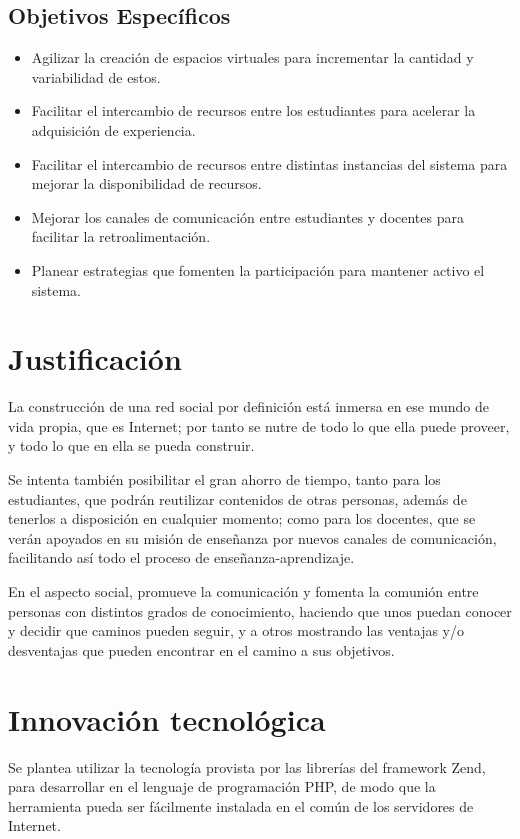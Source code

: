 \subsection{Objetivos Específicos}
\begin{itemize}
\item Agilizar la creación de espacios virtuales para incrementar la cantidad y
variabilidad de estos.
\item Facilitar el intercambio de recursos entre los estudiantes para acelerar
la adquisición de experiencia.
\item Facilitar el intercambio de recursos entre distintas instancias del
sistema para mejorar la disponibilidad de recursos.
\item Mejorar los canales de comunicación entre estudiantes y docentes para
facilitar la retroalimentación.
\item Planear estrategias que fomenten la participación para mantener activo el
sistema.
\end{itemize}

\section{Justificación}
La construcción de una red social por definición está inmersa en ese mundo de
vida propia, que es Internet; por tanto se nutre de todo lo que ella puede
proveer, y todo lo que en ella se pueda construir.

Se intenta también posibilitar el gran ahorro de tiempo, tanto para los
estudiantes, que podrán reutilizar contenidos de otras personas, además de
tenerlos a disposición en cualquier momento; como para los docentes, que se
verán apoyados en su misión de enseñanza por nuevos canales de comunicación,
facilitando así todo el proceso de enseñanza-aprendizaje.

En el aspecto social, promueve la comunicación y fomenta la comunión entre
personas con distintos grados de conocimiento, haciendo que unos puedan conocer
y decidir que caminos pueden seguir, y a otros mostrando las ventajas y/o
desventajas que pueden encontrar en el camino a sus objetivos.

\section{Innovación tecnológica}
Se plantea utilizar la tecnología provista por las librerías del framework
Zend, para desarrollar en el lenguaje de programación PHP, de modo que la
herramienta pueda ser fácilmente instalada en el común de los servidores de
Internet.

